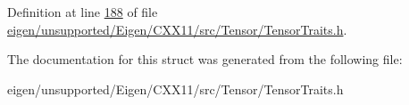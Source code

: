 Definition at line \hyperlink{eigen_2unsupported_2_eigen_2_c_x_x11_2src_2_tensor_2_tensor_traits_8h_source_l00188}{188} of file \hyperlink{eigen_2unsupported_2_eigen_2_c_x_x11_2src_2_tensor_2_tensor_traits_8h_source}{eigen/unsupported/\+Eigen/\+C\+X\+X11/src/\+Tensor/\+Tensor\+Traits.\+h}.



The documentation for this struct was generated from the following file\+:\begin{DoxyCompactItemize}
\item 
eigen/unsupported/\+Eigen/\+C\+X\+X11/src/\+Tensor/\+Tensor\+Traits.\+h\end{DoxyCompactItemize}
